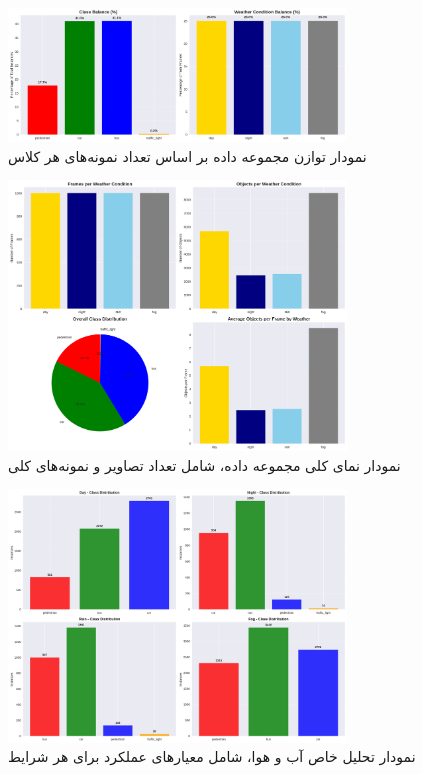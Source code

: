 \documentclass[oneside]{report}
\begin{document}
\begin{figure}[H]
  \centering
  \includegraphics[width=0.8\textwidth]{images/data1/dataset_balance.png}
  \caption{نمودار توازن مجموعه داده بر اساس تعداد نمونه‌های هر کلاس}
\end{figure}

\begin{figure}[H]
  \centering
  \includegraphics[width=0.8\textwidth]{images/data1/dataset_overview.png}
  \caption{نمودار نمای کلی مجموعه داده، شامل تعداد تصاویر و نمونه‌های کلی}
\end{figure}

\begin{figure}[H]
  \centering
  \includegraphics[width=0.8\textwidth]{images/data1/weather_specific_analysis.png}
  \caption{نمودار تحلیل خاص آب و هوا، شامل معیارهای عملکرد برای هر شرایط}
\end{figure}
\end{document}
